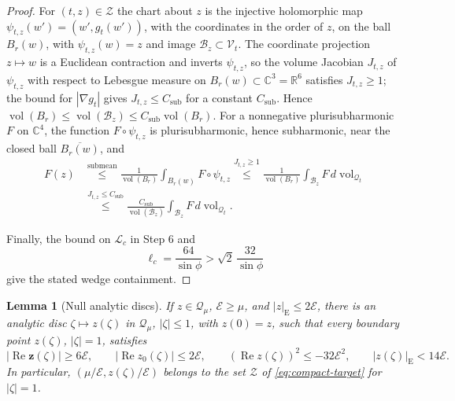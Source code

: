 \documentclass[11pt]{amsart}
\numberwithin{equation}{section}
\newtheorem{lemma}[theorem]{Lemma}
\theoremstyle{definition}
\newcommand{\R}{\mathbb R}
\newcommand{\C}{\mathbb C}
\newcommand{\bz}{\mathbf z}
\newcommand{\Energy}{\mathcal E}
\newcommand{\vol}{\operatorname{vol}}
\newcommand{\Rea}{\operatorname{Re}}
\begin{document}
\begin{proof}
For
\((t,z)\in\mathscr Z\) the chart about \(z\) is the injective holomorphic map
\(\psi_{t,z}(w')=(w',g_t(w'))\), with the coordinates in the order of \(z\),
on the ball \(B_r(w)\), with \(\psi_{t,z}(w)=z\) and image
\(\mathcal B_z\subset\mathcal V_t\). The coordinate projection \(z\mapsto w\)
is a Euclidean contraction and inverts \(\psi_{t,z}\), so the volume
Jacobian \(J_{t,z}\) of \(\psi_{t,z}\) with respect to Lebesgue measure on
\(B_r(w)\subset\C^3=\R^6\) satisfies \(J_{t,z}\ge1\); the bound for
\(|\nabla g_t|\) gives \(J_{t,z}\le C_{\mathrm{sub}}\) for a constant
\(C_{\mathrm{sub}}\). Hence
\(\vol(B_r)\le\vol(\mathcal B_z)\le C_{\mathrm{sub}}\vol(B_r)\). For a
nonnegative plurisubharmonic \(F\) on \(\C^4\), the function
\(F\circ\psi_{t,z}\) is plurisubharmonic, hence subharmonic, near the
closed ball \(\overline{B_r(w)}\), and
\begin{align*}
 F(z)
 &\overset{\text{submean}}{\le}
   \frac1{\vol(B_r)}\int_{B_r(w)}F\circ\psi_{t,z}
 \overset{J_{t,z}\ge1}{\le}
   \frac1{\vol(B_r)}\int_{\mathcal B_z}F\,d\vol_{\mathcal Q_t}\\
 &\overset{J_{t,z}\le C_{\mathrm{sub}}}{\le}
   \frac{C_{\mathrm{sub}}}{\vol(\mathcal B_z)}
   \int_{\mathcal B_z}F\,{d\vol_{\mathcal Q_t}}.
\end{align*}

Finally, the bound on \(\mathscr L_c\) in Step 6 and
\[
 \ell_c=\frac{64}{\sin\phi}
 >\sqrt2\,\frac{32}{\sin\phi}
\]
give the stated wedge containment.
\end{proof}

\begin{lemma}[Null analytic discs]\label{lem:null-discs}
If \(z\in\mathcal Q_\mu\), \(\Energy\ge\mu\), and
\(|z|_{\mathrm E}\le2\Energy\), there is an analytic disc
\(\zeta\mapsto z(\zeta)\) in \(\mathcal Q_\mu\), \(|\zeta|\le1\), with
\(z(0)=z\), such that every boundary point \(z(\zeta)\), \(|\zeta|=1\),
satisfies
\[
 \lvert\Rea\bz(\zeta)\rvert\ge6\Energy,\qquad
 \lvert\Rea z_0(\zeta)\rvert\le2\Energy,\qquad
 (\Rea z(\zeta))^2\le-32\Energy^2,\qquad
 |z(\zeta)|_{\mathrm E}<14\Energy.
\]
In particular, \((\mu/\Energy,z(\zeta)/\Energy)\) belongs to the set
\(\mathscr Z\) of \eqref{eq:compact-target} for \(|\zeta|=1\).
\end{lemma}
\end{document}
